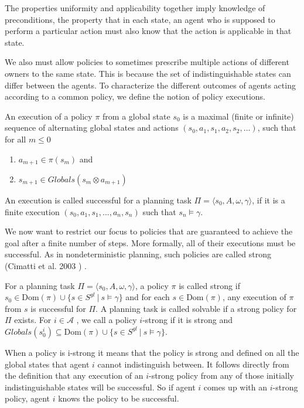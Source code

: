 The properties uniformity and applicability together imply knowledge of preconditions, the property that in each state, an agent who is supposed to perform a particular action must also know that the action is applicable in that state.

We also must allow policies to sometimes prescribe multiple actions of different owners to the same state. This is because the set of indistinguishable states can differ between the agents. To characterize the different outcomes of agents acting according to a common policy, we define the notion of policy executions.

An execution of a policy $\pi$ from a global state $s_0$ is a maximal (finite or infinite) sequence of alternating global states and actions $(s_0, a_1, s_1, a_2, s_2,...)$, such that for all $ m \leq 0$
\begin{enumerate}
  \item $a_{m+1} \in \pi(s_m)$ and
  \item $s_{m+1} \in Globals(s_m \otimes a_{m+1})$
\end{enumerate}
An execution is called successful for a planning task $\Pi = \langle s_0, A, \omega, \gamma \rangle$, if it is a finite execution $(s_0, a_1, s_1,...,a_n, s_n)$ such that $s_n \models \gamma$.


We now want to restrict our focus to policies that are guaranteed to achieve the goal after a finite number of steps. More formally, all of their executions must be successful. As in nondeterministic planning, such policies are called strong (Cimatti et al. 2003 \cite{cimattietal}) .

For a planning task $\Pi = \langle s_0, A, \omega, \gamma \rangle$, a policy $\pi$ is called strong if $s_0 \in \text{Dom}(\pi) \cup \{s \in S^{gl} ~|~ s \models \gamma\}$ and for each $s \in \text{Dom}(\pi)$, any execution of $\pi$ from $s$ is successful for $\Pi$. A planning task is called solvable if a strong policy for $\Pi$ exists.
For $ i \in \mathcal{A} $ , we call a policy $i$-strong if it is strong and  $Globals(s_0^i ) \subseteq \text{Dom}(\pi) \cup\{ s \in S^{gl} ~|~ s \models \gamma \}$.

When a policy is i-strong it means that the policy is strong and defined on all the global states that agent $i$ cannot indistinguish between. It follows directly from the definition that any execution of an $i$-strong policy from any of those initially indistinguishable states will be successful. So if agent $i$ comes up with an $i$-strong policy, agent $i$ knows the policy to be successful.

